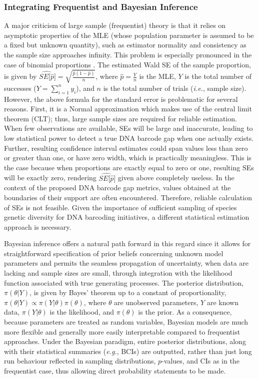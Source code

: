 \documentclass[12pt]{article}
\begin{document}
\subsubsection{Integrating Frequentist and Bayesian Inference}

A major criticism of large sample (frequentist) theory is that it relies on asymptotic properties of the MLE (whose population parameter is assumed to be a fixed but unknown quantity), such as estimator normality and consistency as the sample size approaches infinity. This problem is especially pronounced in the case of binomial proportions \citep{newcombe1998confidence}. The estimated Wald SE of the sample proportion, is given by $\widehat{SE[\hat{p}}] = \sqrt{\frac{\hat{p}(1 - \hat{p})}{n}}$, where $\hat{p} = \frac{Y}{n}$ is the MLE, $Y$ is the total number of successes ($Y = \sum_{i=1}^n{y_i}$), and $n$ is the total number of trials (\textit{i.e.}, sample size). However, the above formula for the standard error is problematic for several reasons. First, it is a Normal approximation which makes use of the central limit theorem (CLT); thus, large sample sizes are required for reliable estimation. When few observations are available, SEs will be large and inaccurate, leading to low statistical power to detect a true DNA barcode gap when one actually exists. Further, resulting confidence interval estimates could span values less than zero or greater than one, or have zero width, which is practically meaningless. This is the case because when proportions are exactly equal to zero or one, resulting SEs will be exactly zero, rendering $\widehat{SE[\hat{p}}]$ given above completely useless. In the context of the proposed DNA barcode gap metrics, values obtained at the boundaries of their support are often encountered. Therefore, reliable calculation of SEs is not feasible. Given the importance of sufficient sampling of species genetic diversity for DNA barcoding initiatives, a different statistical estimation approach is necessary. 

Bayesian inference offers a natural path forward in this regard since it allows for \\ straightforward specification of prior beliefs concerning unknown model parameters and permits the seamless propagation of uncertainty, when data are lacking and sample sizes are small, through integration with the likelihood function associated with true generating processes. The posterior distribution, $\pi(\theta | Y)$, is given by Bayes' theorem up to a constant of proportionality, $\pi(\theta | Y) \propto \pi(Y | \theta)\pi(\theta)$, where $\theta$ are unobserved parameters, $Y$ are known data, $\pi(Y | \theta)$ is the likelihood, and $\pi(\theta)$ is the prior.  As a consequence, because parameters are treated as random variables, Bayesian models are much more flexible and generally more easily interpretable compared to frequentist approaches. Under the Bayesian paradigm, entire posterior distributions, along with their statistical summaries (\textit{e.g.}, BCIs) are outputted, rather than just long run behaviour reflected in sampling distributions, $p$-values, and CIs as in the frequentist case, thus allowing direct probability statements to be made. 
\end{document}
